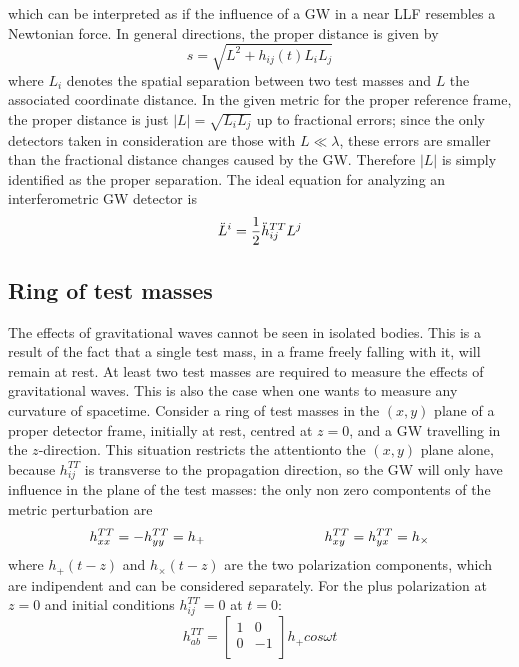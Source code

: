 \documentclass[binding=0.6cm, LaM]{sapthesis}
\begin{document}
which can be interpreted as if the influence of a GW in a near LLF resembles a Newtonian force.
In general directions, the proper distance is given by
\begin{equation}
s = \sqrt{L^2 + h_{ij}(t)L_{i}L_{j}}
\end{equation}
where $L_i$ denotes the spatial separation between two test masses and $L$ the associated coordinate distance.
In the given metric for the proper reference frame, the proper distance is just $|L| = \sqrt{L_iL_j}$ up to fractional errors; since the only detectors taken in consideration are those with $L \ll \lambda$, these errors are smaller than the fractional distance changes caused by the GW. Therefore $|L|$ is simply identified as the proper separation. The ideal equation for analyzing an interferometric GW detector is
\begin{equation}
{\ddot L}^i = {1 \over 2}{\ddot h}_{ij}^{TT}L^j
\end{equation}
 
\subsection{Ring of test masses}
The effects of gravitational waves cannot be seen in isolated bodies. This is a result of
the fact that a single test mass, in a frame freely falling with it, will remain at rest. At
least two test masses are required to measure the effects of gravitational waves. This is also
the case when one wants to measure any curvature of spacetime. 
Consider a ring of test masses in the $(x, y)$ plane of a proper detector frame, initially at rest, centred at $z = 0$, and a GW travelling in the $z$-direction. This situation restricts the attentionto the $(x,y)$ plane alone, because $h_{ij}^{TT}$ is transverse to the propagation direction, so the GW will only have influence in the plane of the test masses: the only non zero compontents of the metric perturbation are
\begin{equation}
h_{xx}^{TT} = - h_{yy}^{TT} = h_{+} \hspace*{3cm} h_{xy}^{TT} = h_{yx}^{TT} = h_{\times}
\end{equation}
where $h_{+}(t-z)$ and $h_{\times}(t-z)$ are the two polarization components, which are indipendent and can be considered separately.
For the plus polarization at $z=0$ and initial conditions $h_{ij}^{TT} = 0$ at $t=0$:
\begin{equation}
h_{ab}^{TT} = 
\begin{bmatrix}
1  & 0 \\
0 &  -1 \\
\end{bmatrix} 
h_{+}cos \omega t
\end{equation}
\end{document}

